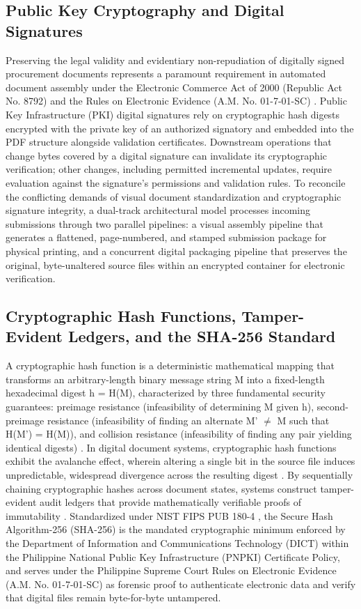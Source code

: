 \subsection{Public Key Cryptography and Digital Signatures}

Preserving the legal validity and evidentiary non-repudiation of digitally signed procurement documents represents a paramount requirement in automated document assembly under the Electronic Commerce Act of 2000 (Republic Act No. 8792) and the Rules on Electronic Evidence (A.M. No. 01-7-01-SC) \cite{ref10, ref11}.
Public Key Infrastructure (PKI) digital signatures rely on cryptographic hash digests encrypted with the private key of an authorized signatory and embedded into the PDF structure alongside validation certificates.
Downstream operations that change bytes covered by a digital signature can invalidate its cryptographic verification; other changes, including permitted incremental updates, require evaluation against the signature's permissions and validation rules.
To reconcile the conflicting demands of visual document standardization and cryptographic signature integrity, a dual-track architectural model processes incoming submissions through two parallel pipelines: a visual assembly pipeline that generates a flattened, page-numbered, and stamped submission package for physical printing, and a concurrent digital packaging pipeline that preserves the original, byte-unaltered source files within an encrypted container for electronic verification.

\subsection{Cryptographic Hash Functions, Tamper-Evident Ledgers, and the SHA-256 Standard}

A cryptographic hash function is a deterministic mathematical mapping that transforms an arbitrary-length binary message string M into a fixed-length hexadecimal digest h = H(M), characterized by three fundamental security guarantees: preimage resistance (infeasibility of determining M given h), second-preimage resistance (infeasibility of finding an alternate M' $\neq$ M such that H(M') = H(M)), and collision resistance (infeasibility of finding any pair yielding identical digests) \cite{ref43}.
In digital document systems, cryptographic hash functions exhibit the avalanche effect, wherein altering a single bit in the source file induces unpredictable, widespread divergence across the resulting digest \cite{ref43}.
By sequentially chaining cryptographic hashes across document states, systems construct tamper-evident audit ledgers that provide mathematically verifiable proofs of immutability \cite{ref44}.
Standardized under NIST FIPS PUB 180-4 \cite{ref43}, the Secure Hash Algorithm-256 (SHA-256) is the mandated cryptographic minimum enforced by the Department of Information and Communications Technology (DICT) within the Philippine National Public Key Infrastructure (PNPKI) Certificate Policy, and serves under the Philippine Supreme Court Rules on Electronic Evidence (A.M. No. 01-7-01-SC) \cite{ref11} as forensic proof to authenticate electronic data and verify that digital files remain byte-for-byte untampered.

